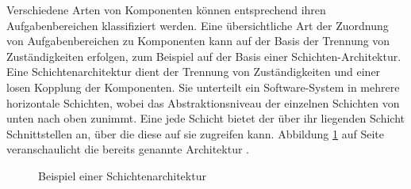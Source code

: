 Verschiedene Arten von Komponenten können entsprechend ihren Aufgabenbereichen klassifiziert werden. Eine übersichtliche Art der Zuordnung von Aufgabenbereichen zu Komponenten kann auf der Basis der Trennung von Zuständigkeiten erfolgen, zum Beispiel auf der Basis einer Schichten-Architektur. Eine Schichtenarchitektur dient der Trennung von Zuständigkeiten und einer losen Kopplung der Komponenten. Sie unterteilt ein Software-System in mehrere horizontale Schichten, wobei das Abstraktionsniveau der einzelnen Schichten von unten nach oben zunimmt. Eine jede Schicht bietet der über ihr liegenden Schicht Schnittstellen an, über die diese auf sie zugreifen kann. Abbildung \ref{fig:2_Schichtenarchitektur} auf Seite \pageref{fig:2_Schichtenarchitektur} veranschaulicht die bereits genannte Architektur \citereset \autocite{Andresen.2003}.
\begin{figure}[h]
\centering
\caption[
Beispiel einer Schichtenarchitektur, Urldate: 04.2014 \newline
]{Beispiel einer Schichtenarchitektur}
\label{fig:2_Schichtenarchitektur}
\end{figure}





